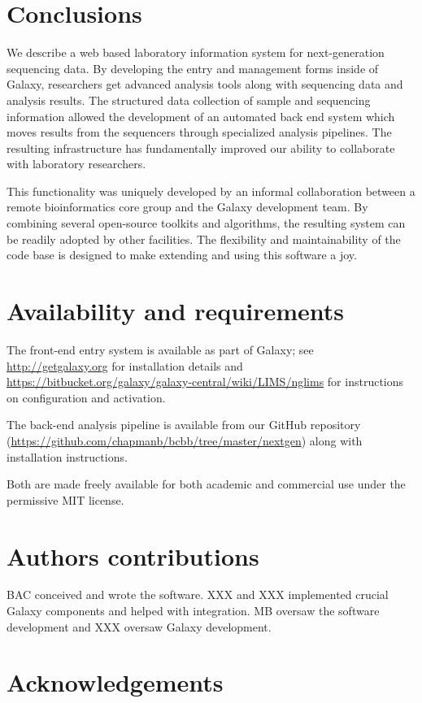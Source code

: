 \documentclass[10pt]{bmc_article}
\newenvironment{bmcformat}{\begin{raggedright}\baselineskip20pt\sloppy\setboolean{publ}{false}}{\end{raggedright}\baselineskip20pt\sloppy}
\begin{document}
\begin{bmcformat}
\section*{Conclusions}

We describe a web based laboratory information system for
next-generation sequencing data. By developing the entry and
management forms inside of Galaxy, researchers get advanced analysis
tools along with sequencing data and analysis results. The structured
data collection of sample and sequencing information allowed the
development of an automated back end system which moves results from
the sequencers through specialized analysis pipelines. The resulting
infrastructure has fundamentally improved our ability to collaborate
with laboratory researchers.

This functionality was uniquely developed by an informal collaboration
between a remote bioinformatics core group and the Galaxy development
team. By combining several open-source toolkits and algorithms, the
resulting system can be readily adopted by other facilities. The
flexibility and maintainability of the code base is designed to make
extending and using this software a joy.

\section*{Availability and requirements}

The front-end entry system is available as part of Galaxy; see
\url{http://getgalaxy.org} for installation details and
\url{https://bitbucket.org/galaxy/galaxy-central/wiki/LIMS/nglims} for
instructions on configuration and activation.

The back-end analysis pipeline is available from our GitHub repository
(\url{https://github.com/chapmanb/bcbb/tree/master/nextgen}) along
with installation instructions.

Both are made freely available for both academic and commercial use
under the permissive MIT license.

\section*{Authors contributions}

BAC conceived and wrote the software. XXX and XXX implemented crucial
Galaxy components and helped with integration. MB oversaw the software
development and XXX oversaw Galaxy development.

\section*{Acknowledgements}


\end{bmcformat}
\end{document}
